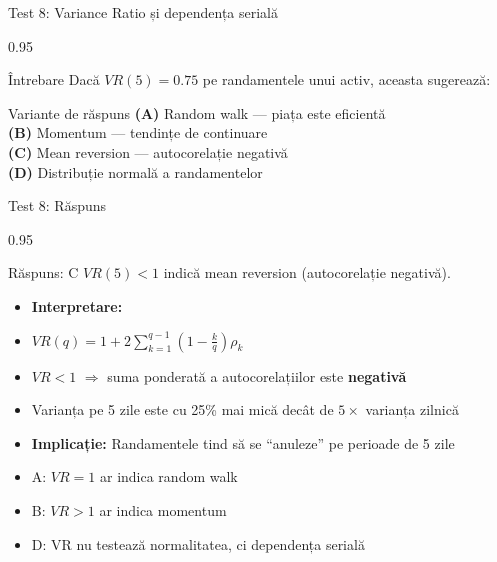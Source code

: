 \documentclass[9pt, aspectratio=169, t]{beamer}
\begin{document}
\begin{frame}{Test 8: Variance Ratio și dependența serială}
\begin{cminipage}{0.95\textwidth}
    \begin{alertblock}{Întrebare}
        Dacă $VR(5) = 0.75$ pe randamentele unui activ, aceasta sugerează:
    \end{alertblock}

    \vspace{0.5cm}
    \begin{block}{Variante de răspuns}
    \textcolor{MainBlue}{\textbf{(A)}} Random walk --- piața este eficientă\\[3pt]
    \textcolor{MainBlue}{\textbf{(B)}} Momentum --- tendințe de continuare\\[3pt]
    \textcolor{MainBlue}{\textbf{(C)}} Mean reversion --- autocorelație negativă\\[3pt]
    \textcolor{MainBlue}{\textbf{(D)}} Distribuție normală a randamentelor
    \end{block}
\end{cminipage}
\end{frame}

\begin{frame}{Test 8: Răspuns}
\begin{cminipage}{0.95\textwidth}
    \begin{exampleblock}{Răspuns: C}
        $VR(5) < 1$ indică mean reversion (autocorelație negativă).
    \end{exampleblock}

    \vspace{0.2cm}

    \begin{itemize}\setlength{\itemsep}{0pt}
        \item \textbf{Interpretare:}
        \item $VR(q) = 1 + 2\sum_{k=1}^{q-1}\left(1 - \frac{k}{q}\right)\rho_k$
        \item $VR < 1$ $\Rightarrow$ suma ponderată a autocorelațiilor este \textbf{negativă}
        \item Varianța pe 5 zile este cu 25\% mai mică decât de $5\times$ varianța zilnică
        \item \textbf{Implicație:} Randamentele tind să se ``anuleze'' pe perioade de 5 zile
        \item A: $VR = 1$ ar indica random walk \incorrect
        \item B: $VR > 1$ ar indica momentum \incorrect
        \item D: VR nu testează normalitatea, ci dependența serială \incorrect
    \end{itemize}
\end{cminipage}
\end{frame}
\end{document}
